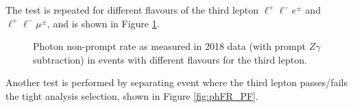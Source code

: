 The test is repeated for different flavours of the third lepton $\ell^+ \ell^- e^\pm$ and $\ell^+ \ell^- \mu^\pm$, and is shown in Figure \ref{fig:phFR_em}.

\begin{figure}
\caption{Photon non-prompt rate as measured in 2018 data (with prompt $Z\gamma$ subtraction) in events with different flavours for the third lepton.}
\label{fig:phFR_em}
\end{figure}

Another test is performed by separating event where the third lepton passes/fails the tight analysis selection, shown in Figure \ref{fig:phFR_PF}.

